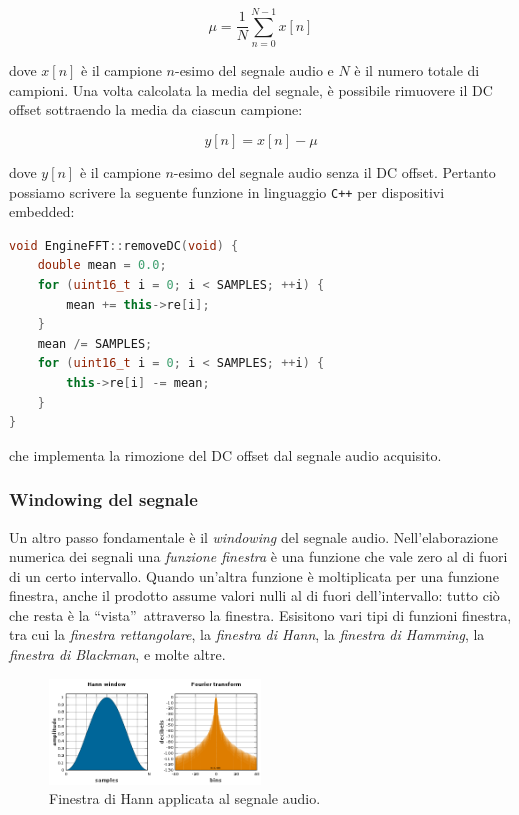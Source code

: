 \documentclass[a4paper,12pt]{report}  %
\newcommand{\lstinlinebg}[1]{\colorbox{backcolour}{\lstinline|#1|}}
\begin{document}
\begin{equation}
    \mu = \frac{1}{N} \sum_{n = 0}^{N - 1} x[n] \nonumber
\end{equation}

dove $x[n]$ è il campione $n$-esimo del segnale audio e $N$ è il numero totale di campioni.
Una volta calcolata la media del segnale, è possibile rimuovere il DC offset sottraendo la media da ciascun campione:

\begin{equation}
    y[n] = x[n] - \mu \nonumber
\end{equation}

dove $y[n]$ è il campione $n$-esimo del segnale audio senza il DC offset.
Pertanto possiamo scrivere la seguente funzione in linguaggio \lstinlinebg{C++} per dispositivi embedded:

\begin{lstlisting}[language=C++,keywords={void, double, float, this, uint16_t, this, for}]
void EngineFFT::removeDC(void) {
    double mean = 0.0;
    for (uint16_t i = 0; i < SAMPLES; ++i) {
        mean += this->re[i];
    }
    mean /= SAMPLES;
    for (uint16_t i = 0; i < SAMPLES; ++i) {
        this->re[i] -= mean;
    }
}
\end{lstlisting}

che implementa la rimozione del DC offset dal segnale audio acquisito.

\subsubsection{Windowing del segnale}\label{sec:windowing}
Un altro passo fondamentale è il \textit{windowing} del segnale audio.
Nell'elaborazione numerica dei segnali una \textit{funzione finestra} è una funzione che vale zero al di fuori di un certo intervallo.
Quando un'altra funzione è moltiplicata per una funzione finestra, anche il prodotto assume valori nulli al di fuori dell'intervallo: tutto ciò che resta è la \textquotedblleft vista\textquotedblright \ attraverso la finestra.
Esisitono vari tipi di funzioni finestra, tra cui la \textit{finestra rettangolare}, la \textit{finestra di Hann}, la \textit{finestra di Hamming}, la \textit{finestra di Blackman}, e molte altre.

\begin{figure}[h]
    \centering
    \includegraphics[width=0.5\textwidth]{imgs/Window_function_Hann.png}
    \caption{Finestra di Hann applicata al segnale audio.}
    \label{fig:hann_window}
\end{figure}
\end{document}

